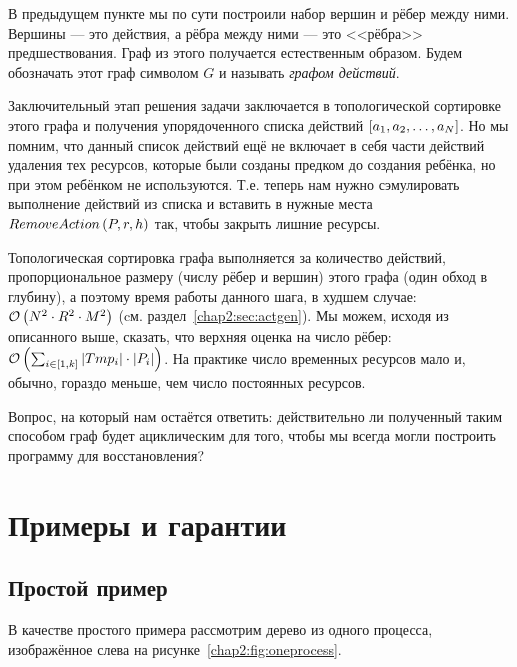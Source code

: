 В предыдущем пункте мы по сути построили набор вершин и рёбер между ними. Вершины --- это действия, а рёбра между ними --- это <<рёбра>> предшествования. Граф из этого получается естественным образом. Будем обозначать этот граф символом $G$ и называть \emph{графом действий}.

Заключительный этап решения задачи заключается в топологической сортировке этого графа и получения упорядоченного списка действий $\left[ a_1, a_2, \ldots, a_{N} \right]$. Но мы помним, что данный список действий ещё не включает в себя части действий удаления тех ресурсов, которые были созданы предком до создания ребёнка, но при этом ребёнком не используются. Т.е. теперь нам нужно сэмулировать выполнение действий из списка и вставить в нужные места \\
$RemoveAction\left( P, r, h \right)$ так, чтобы закрыть лишние ресурсы.

Топологическая сортировка графа выполняется за количество действий, пропорциональное размеру (числу рёбер и вершин) этого графа (один обход в глубину), а поэтому время работы данного шага, в худшем случае: $\mathcal{O}\left(N^2 \cdot R^2 \cdot M^2\right)$ (cм. раздел~\ref{chap2:sec:actgen}). Мы можем, исходя из описанного выше, сказать, что верхняя оценка на число рёбер: $\mathcal{O}\left(\sum_{i \in [1, k]}{|Tmp_i| \cdot |P_i|}\right)$. На практике число временных ресурсов мало и, обычно, гораздо меньше, чем число постоянных ресурсов.

Вопрос, на который нам остаётся ответить: действительно ли полученный таким способом граф будет ациклическим для того, 
чтобы мы всегда могли построить программу для восстановления?

\section{Примеры и гарантии}
\label{chap2:seq:guarantees}

\subsection{Простой пример}

В качестве простого примера рассмотрим дерево из одного процесса, изображённое слева на рисунке~\ref{chap2:fig:oneprocess}.

